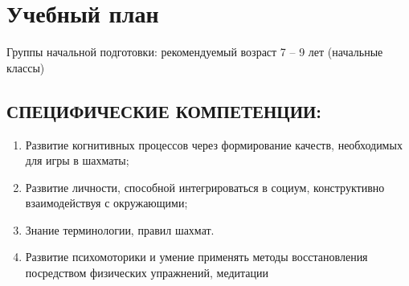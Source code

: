 \chapter*{Учебный план}

Группы начальной подготовки: рекомендуемый возраст 7 – 9 лет (начальные классы)

\section*{СПЕЦИФИЧЕСКИЕ КОМПЕТЕНЦИИ:}

\begin{enumerate}
\item Развитие когнитивных процессов через формирование качеств, необходимых для игры в шахматы;
\item Развитие личности, способной интегрироваться в социум, конструктивно взаимодействуя с окружающими;
\item Знание терминологии, правил шахмат.
\item Развитие психомоторики и умение применять методы восстановления посредством физических упражнений, медитации 
\end{enumerate}

